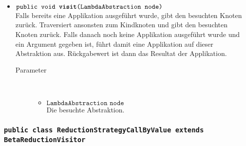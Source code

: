 \begin{description}
\begin{itemize}
		\item $\texttt{public void \textbf{visit}(LambdaAbstraction node)}$ \\ Falls bereits eine Applikation ausgeführt wurde, gibt den besuchten Knoten zurück. Traversiert ansonsten zum Kindknoten und gibt den besuchten Knoten zurück. Falls danach noch keine Applikation ausgeführt wurde und ein Argument gegeben ist, führt damit eine Applikation auf dieser Abstraktion aus. Rückgabewert ist dann das Resultat der Applikation.
		\begin{description}
			\item[Parameter] \hfill \\
			\vspace{-.8cm}
			\begin{itemize}
				\item $\texttt{LambdaAbstraction node}$ \\ Die besuchte Abstraktion.
			\end{itemize}
		\end{description}
	\end{itemize}
\end{description}

\subsubsection{\normalfont \texttt{public class \textbf{ReductionStrategyCallByValue} extends BetaReductionVisitor}}

